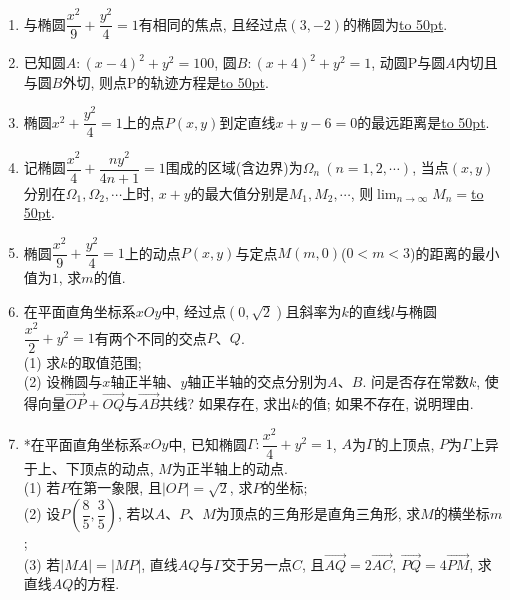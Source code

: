 \documentclass[10pt,a4paper]{article}
\newcommand{\blank}[1]{\underline{\hbox to #1pt{}}}
\begin{document}
\begin{enumerate}[1.]
\item 与椭圆$\dfrac{x^2}9+\dfrac{y^2}4=1$有相同的焦点, 且经过点$(3,-2)$的椭圆为\blank{50}.
\item 已知圆$A:(x-4)^2+y^2=100$, 圆$B:(x+4)^2+y^2=1$, 动圆P与圆$A$内切且与圆$B$外切, 则点P的轨迹方程是\blank{50}.
\item 椭圆${x^2}+\dfrac{y^2}4=1$上的点$P(x,y)$到定直线$x+y-6=0$的最远距离是\blank{50}.
\item 记椭圆$\dfrac{x^2}4+\dfrac{n{y^2}}{4n+1}=1$围成的区域(含边界)为$\Omega_n \ (n=1,2,\cdots)$, 当点$(x,y)$分别在$\Omega_1,\Omega_2,\cdots$上时, $x+y$的最大值分别是$M_1,M_2,\cdots$, 则$\displaystyle\lim_{n\to \infty}M_n=$\blank{50}.
\item 椭圆$\dfrac{x^2}9+\dfrac{y^2}4=1$上的动点$P(x,y)$与定点$M(m,0)$($0<m<3$)的距离的最小值为$1$, 求$m$的值.
\item 在平面直角坐标系$xOy$中, 经过点$(0,\sqrt 2)$且斜率为$k$的直线$l$与椭圆$\dfrac{x^2}2+y^2=1$有两个不同的交点$P$、$Q$.\\
(1) 求$k$的取值范围;\\
(2) 设椭圆与$x$轴正半轴、$y$轴正半轴的交点分别为$A$、$B$. 问是否存在常数$k$, 使得向量$\overrightarrow{OP}+\overrightarrow{OQ}$与$\overrightarrow{AB}$共线? 如果存在, 求出$k$的值; 如果不存在, 说明理由.
\item *在平面直角坐标系$xOy$中, 已知椭圆$\Gamma:\dfrac{x^2}4+{y^2}=1$, $A$为$\Gamma$的上顶点, $P$为$\Gamma$上异于上、下顶点的动点, $M$为正半轴上的动点.\\
(1) 若$P$在第一象限, 且$|OP|=\sqrt 2$, 求$P$的坐标;\\
(2) 设$P(\dfrac 85,\dfrac 35)$, 若以$A$、$P$、$M$为顶点的三角形是直角三角形, 求$M$的横坐标$m$;\\
(3) 若$|MA|=|MP|$, 直线$AQ$与$\Gamma$交于另一点$C$, 且$\overrightarrow{AQ}=2\overrightarrow{AC}$, $\overrightarrow{PQ}=4\overrightarrow{PM}$, 求直线$AQ$的方程.




\end{enumerate}
\end{document}
